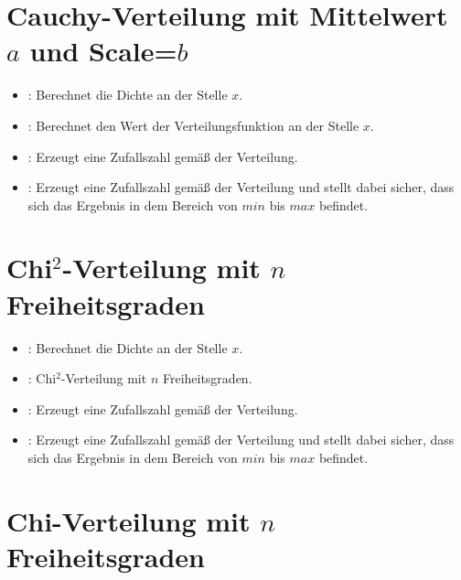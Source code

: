 \section{Cauchy-Verteilung mit Mittelwert \texorpdfstring{$a$}{a} und Scale=\texorpdfstring{$b$}{b}}

\begin{itemize}

\item
{}:
Berechnet die Dichte an der Stelle $x$.

\item
{}:
Berechnet den Wert der Verteilungsfunktion an der Stelle $x$.

\item
{}:
Erzeugt eine Zufallszahl gemäß der Verteilung.

\item
{}:
Erzeugt eine Zufallszahl gemäß der Verteilung und stellt dabei sicher, dass sich das Ergebnis in dem Bereich von $min$ bis $max$ befindet.

\end{itemize}



\section{\texorpdfstring{Chi$^2$}{Chi2}-Verteilung mit \texorpdfstring{$n$}{n} Freiheitsgraden}

\begin{itemize}

\item
{}:
Berechnet die Dichte an der Stelle $x$.

\item
{}:
Chi$^2$-Verteilung mit $n$ Freiheitsgraden.

\item
{}:
Erzeugt eine Zufallszahl gemäß der Verteilung.

\item
{}:
Erzeugt eine Zufallszahl gemäß der Verteilung und stellt dabei sicher, dass sich das Ergebnis in dem Bereich von $min$ bis $max$ befindet.

\end{itemize}



\section{Chi-Verteilung mit \texorpdfstring{$n$}{n} Freiheitsgraden}

